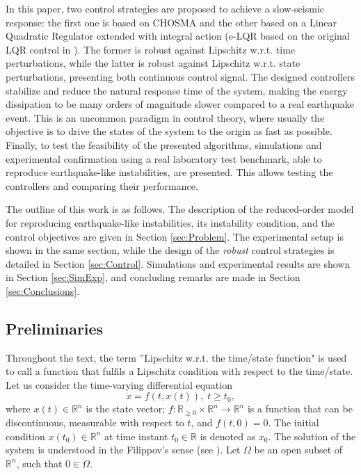 \documentclass[journal,twoside,web]{ieeecolor}
\begin{document}
In this paper, two control strategies are proposed to achieve a slow-seismic response: the first one is based on CHOSMA and the other based on a Linear Quadratic Regulator extended with integral action (e-LQR based on the original LQR control in \cite{b:Kalman-1960}). The former is robust against Lipschitz w.r.t. time perturbations, while the latter is robust against Lipschitz w.r.t. state perturbations, presenting both continuous control signal. The designed controllers stabilize and reduce the natural response time of the system, making the energy dissipation to be many orders of magnitude slower compared to a real earthquake event. This is an uncommon paradigm in control theory, where usually the objective is to drive the states of the system to the origin as fast as possible. Finally, to test the feasibility of the presented algorithms, simulations and experimental confirmation using a real laboratory test benchmark, able to reproduce earthquake-like instabilities, are presented. This allows testing the controllers and comparing their performance.

The outline of this work is as follows. The description of the reduced-order model  for reproducing earthquake-like instabilities, its instability condition, and the control objectives are given in Section \ref{sec:Problem}. The experimental setup is shown in the same section, while the design of the \textit{robust} control strategies is detailed in Section \ref{sec:Control}. Simulations and experimental results are shown in Section \ref{sec:SimExp}, and concluding remarks are made in Section \ref{sec:Conclusions}. 

\subsection{Preliminaries}

Throughout the text, the term ''Lipschitz w.r.t. the time/state function" is used to call a function that fulfils a Lipschitz condition with respect to the time/state. Let us consider the time-varying differential equation
    \begin{equation*}
    \dot{x}=f(t,x(t)),\; t\ge t_{0},
    \end{equation*}
where $x(t)\in{\mathbb{R}}^{n}$ is the state vector; $f:{\mathbb{R}}_{\geq 0}\times{\mathbb{R}}^{n}\to{\mathbb{R}}^{n}$ is a function that can be discontinuous, measurable with respect to $t$, and $f(t,0)=0$. The initial condition $x(t_{0})\in{\mathbb{R}}^{n}$ at time instant $t_{0}\in\mathbb{R}$ is denoted as $x_0$. The solution of the system is understood in the Filippov's sense (see \cite{b:filippov}). Let $\Omega$ be an open subset of ${\mathbb{R}}^{n}$, such that $0\in\Omega$. 
\end{document}

